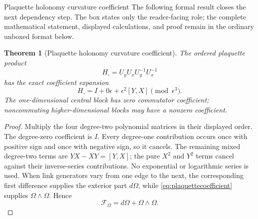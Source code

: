 \documentclass[11pt]{article}
\numberwithin{equation}{section}
\newtheorem{theorem}[definition]{Theorem}
\theoremstyle{remark}
\begin{document}
\begin{proofguide}{Plaquette holonomy curvature coefficient}
The following formal result closes the next dependency step. The box states only the reader-facing role; the complete mathematical statement, displayed calculations, and proof remain in the ordinary unboxed format below.
\end{proofguide}
\begin{theorem}[Plaquette holonomy curvature coefficient]
The ordered plaquette product
\begin{equation}
H_{\square}=U_yU_xU_y^{-1}U_x^{-1}
\end{equation}
has the exact coefficient expansion
\begin{equation}
H_{\square}=I+0\epsilon+\epsilon^2[Y,X]\pmod{\epsilon^3}.
\label{eq:plaquettecoefficient}
\end{equation}
The one-dimensional central block has zero commutator coefficient; noncommuting higher-dimensional blocks may have a nonzero coefficient.
\end{theorem}
\begin{proof}
Multiply the four degree-two polynomial matrices in their displayed order.  The degree-zero coefficient is $I$.  Every degree-one contribution occurs once with positive sign and once with negative sign, so it cancels.  The remaining mixed degree-two terms are $YX-XY=[Y,X]$; the pure $X^2$ and $Y^2$ terms cancel against their inverse-series contributions.  No exponential or logarithmic series is used.  When link generators vary from one edge to the next, the corresponding first difference supplies the exterior part $d\Omega$, while \eqref{eq:plaquettecoefficient} supplies $\Omega\wedge\Omega$.  Hence
\begin{equation}
\mathcal F_\Omega=d\Omega+\Omega\wedge\Omega.
\label{eq:parentcurvaturefromresidual}
\end{equation}
\end{proof}
\end{document}
